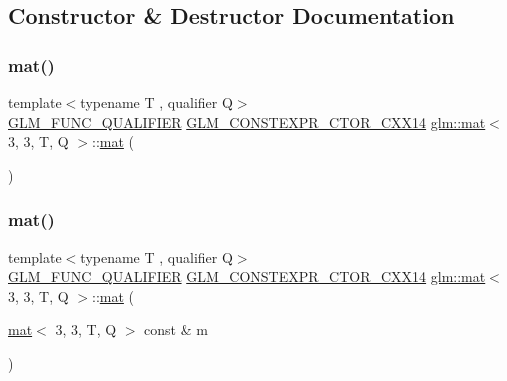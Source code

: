 \subsection{Constructor \& Destructor Documentation}
\mbox{\label{structglm_1_1mat_3_013_00_013_00_01_t_00_01_q_01_4_ab10ee3449d1ee8d793fed6b94fe6270d}} 
\subsubsection{\texorpdfstring{mat()}{mat()}\hspace{0.1cm}{\footnotesize\ttfamily [1/21]}}
{\footnotesize\ttfamily template$<$typename T , qualifier Q$>$ \\
\hyperlink{setup_8hpp_a33fdea6f91c5f834105f7415e2a64407}{G\+L\+M\+\_\+\+F\+U\+N\+C\+\_\+\+Q\+U\+A\+L\+I\+F\+I\+ER} \hyperlink{setup_8hpp_a0900f9145e68bf6061b6f5e7be3fa751}{G\+L\+M\+\_\+\+C\+O\+N\+S\+T\+E\+X\+P\+R\+\_\+\+C\+T\+O\+R\+\_\+\+C\+X\+X14} \hyperlink{structglm_1_1mat}{glm\+::mat}$<$ 3, 3, T, Q $>$\+::\hyperlink{structglm_1_1mat}{mat} (\begin{DoxyParamCaption}{ }\end{DoxyParamCaption})}

\mbox{\label{structglm_1_1mat_3_013_00_013_00_01_t_00_01_q_01_4_a15f1bac6c533d3d97a2caefbbe13f4c1}} 
\subsubsection{\texorpdfstring{mat()}{mat()}\hspace{0.1cm}{\footnotesize\ttfamily [2/21]}}
{\footnotesize\ttfamily template$<$typename T , qualifier Q$>$ \\
\hyperlink{setup_8hpp_a33fdea6f91c5f834105f7415e2a64407}{G\+L\+M\+\_\+\+F\+U\+N\+C\+\_\+\+Q\+U\+A\+L\+I\+F\+I\+ER} \hyperlink{setup_8hpp_a0900f9145e68bf6061b6f5e7be3fa751}{G\+L\+M\+\_\+\+C\+O\+N\+S\+T\+E\+X\+P\+R\+\_\+\+C\+T\+O\+R\+\_\+\+C\+X\+X14} \hyperlink{structglm_1_1mat}{glm\+::mat}$<$ 3, 3, T, Q $>$\+::\hyperlink{structglm_1_1mat}{mat} (\begin{DoxyParamCaption}\item[{\hyperlink{structglm_1_1mat}{mat}$<$ 3, 3, T, Q $>$ const \&}]{m }\end{DoxyParamCaption})}

